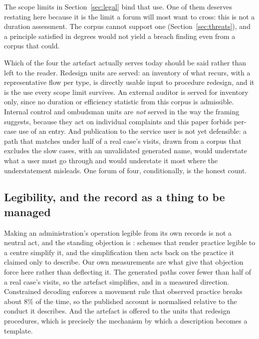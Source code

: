 The scope limits in Section~\ref{sec:legal} bind that use. One of them deserves restating here
because it is the limit a forum will most want to cross: this is not a duration assessment.
The corpus cannot support one (Section~\ref{sec:threats}), and a principle satisfied in degrees
would not yield a breach finding even from a corpus that could.

Which of the four the artefact actually serves today should be said rather than left to the
reader. Redesign units are served: an inventory of what recurs, with a representative flow per
type, is directly usable input to procedure redesign, and it is the use every scope limit
survives. An external auditor is served for inventory only, since no duration or efficiency
statistic from this corpus is admissible. Internal control and ombudsman units are \emph{not}
served in the way the framing suggests, because they act on individual complaints and this paper
forbids per-case use of an entry. And publication to the service user is not yet defensible:
a path that matches under half of a real case's visits, drawn from a corpus that excludes the
slow cases, with an unvalidated generated name, would understate what a user must go through and
would understate it most where the understatement misleads. One forum of four, conditionally, is
the honest count.

\subsection{Legibility, and the record as a thing to be managed}

Making an administration's operation legible from its own records is not a neutral act, and the
standing objection is \citet{scott1998seeing}: schemes that render practice legible to a centre
simplify it, and the simplification then acts back on the practice it claimed only to describe.
Our own measurements are what give that objection force here rather than deflecting it. The
generated paths cover fewer than half of a real case's visits, so the artefact simplifies, and
in a measured direction. Constrained decoding enforces a movement rule that observed practice
breaks about 8\% of the time, so the published account is normalised relative to the conduct it
describes. And the artefact is offered to the units that redesign procedures, which is precisely
the mechanism by which a description becomes a template.

